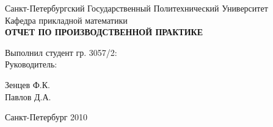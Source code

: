 \begin{titlepage}

\begin{center}

\large Санкт-Петербургский Государственный Политехнический Университет \\
Кафедра прикладной математики \\ [8.0cm]
\textbf{\textsc{ОТЧЕТ ПО ПРОИЗВОДСТВЕННОЙ ПРАКТИКЕ}}\\[3.0cm]

\begin{minipage}{0.4\textwidth}
\begin{flushleft} \large
  Выполнил студент гр. 3057/2: \\ [1.0cm]
  Руководитель:
\end{flushleft}
\end{minipage}
\begin{minipage}{0.4\textwidth}
\begin{flushright} \large
Зенцев Ф.К. \\ [1.0cm]
Павлов Д.А.
\end{flushright}
\end{minipage}

\vfill

\large Санкт-Петербург 2010



\end{center}
\end{titlepage}
